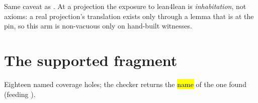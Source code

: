 \begin{remark}
 Same caveat as . At a projection the exposure to lean4lean is
\emph{inhabitation}, not axioms: a real projection's translation exists only through a lemma that
is  at the pin, so this arm is non-vacuous only on hand-built witnesses.
\end{remark}

\section{The supported fragment}
\label{sec:source:fragment}

\begin{definition}
\label{def:SupportError}
\leanok
{} Eighteen named coverage holes; the checker returns the \hl{name} of the one found
(feeding ).


\end{definition}
